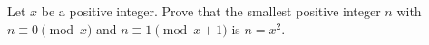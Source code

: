 Let $x$ be a positive integer. Prove that the smallest positive integer $n$ with $n\equiv0\pmod{x}$ and $n\equiv1\pmod{x+1}$ is $n=x^2$.
